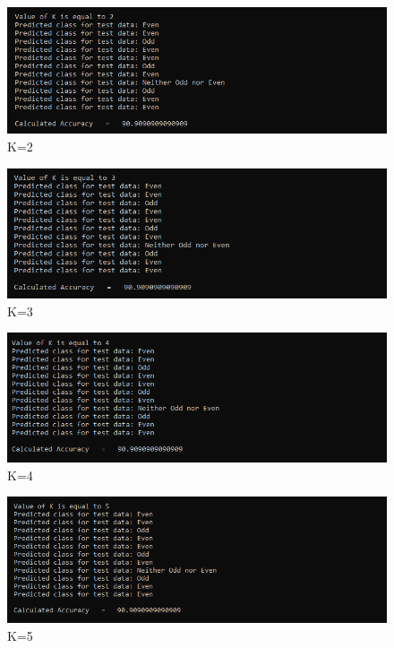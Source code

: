 \documentclass[conference]{IEEEtran}
\begin{document}
\begin{figure}
    \centering
    \includegraphics[width=1.0\linewidth]{K=2.PNG}
    \caption{K=2}
    \label{fig:enter-label}
\end{figure}


\begin{figure}
    \centering
    \includegraphics[width=1.0\linewidth]{K=3.PNG}
    \caption{K=3}
    \label{fig:enter-label}
\end{figure}

\begin{figure}
    \centering
    \includegraphics[width=1.0\linewidth]{K=4.PNG}
    \caption{K=4}
    \label{fig:enter-label}
\end{figure}

\begin{figure}
    \centering
    \includegraphics[width=1.0\linewidth]{K=5.PNG}
    \caption{K=5}
    \label{fig:enter-label}
\end{figure}
\end{document}
